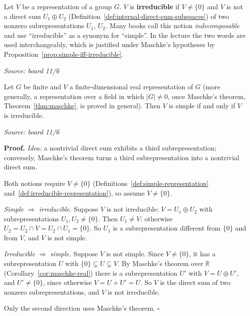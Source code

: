 \documentclass[11pt]{report}
\renewenvironment{proof}[1][Proof]{\noindent\textbf{#1.} }{\hfill$\square$\par\vspace{5pt}}
\newcommand{\srcline}[1]{\par\hfill{\footnotesize\textit{Source: #1}}}
\begin{document}
\begin{defbox}\label{def:irreducible-representation}
Let $V$ be a representation of a group $G$. $V$ is \textbf{irreducible} if $V \neq \{0\}$ and $V$ is not a direct sum $U_1 \oplus U_2$ (Definition~\ref{def:internal-direct-sum-subspaces}) of two nonzero subrepresentations $U_1$, $U_2$.
Many books call this notion \emph{indecomposable} and use ``irreducible'' as a synonym for ``simple''. In the lecture the two words are used interchangeably, which is justified under Maschke's hypotheses by Proposition~\ref{prop:simple-iff-irreducible}.
\srcline{board 11/6}
\end{defbox}

\begin{propbox}\label{prop:simple-iff-irreducible}
Let $G$ be finite and $V$ a finite-dimensional real representation of $G$ (more generally, a representation over a field in which $|G| \neq 0$, once Maschke's theorem, Theorem~\ref{thm:maschke}, is proved in general). Then $V$ is simple if and only if $V$ is irreducible.
\srcline{board 11/6}
\end{propbox}

\begin{proof}
\textit{Idea:} a nontrivial direct sum exhibits a third subrepresentation; conversely, Maschke's theorem turns a third subrepresentation into a nontrivial direct sum.\par
Both notions require $V \neq \{0\}$ (Definitions~\ref{def:simple-representation} and~\ref{def:irreducible-representation}), so assume $V \neq \{0\}$.

\emph{Simple $\Rightarrow$ irreducible.} Suppose $V$ is not irreducible: $V = U_1 \oplus U_2$ with subrepresentations $U_1, U_2 \neq \{0\}$. Then $U_1 \neq V$: otherwise $U_2 = U_2 \cap V = U_2 \cap U_1 = \{0\}$. So $U_1$ is a subrepresentation different from $\{0\}$ and from $V$, and $V$ is not simple.

\emph{Irreducible $\Rightarrow$ simple.} Suppose $V$ is not simple. Since $V \neq \{0\}$, it has a subrepresentation $U$ with $\{0\} \subsetneq U \subsetneq V$. By Maschke's theorem over $\mathbb{R}$ (Corollary~\ref{cor:maschke-real}) there is a subrepresentation $U'$ with $V = U \oplus U'$, and $U' \neq \{0\}$, since otherwise $V = U + U' = U$. So $V$ is the direct sum of two nonzero subrepresentations, and $V$ is not irreducible.

Only the second direction uses Maschke's theorem.
\end{proof}
\end{document}
